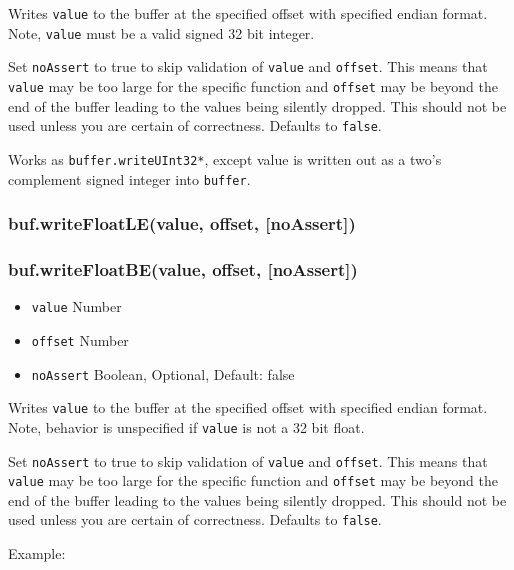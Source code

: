 Writes \texttt{value} to the buffer at the specified offset with
specified endian format. Note, \texttt{value} must be a valid signed 32
bit integer.

Set \texttt{noAssert} to true to skip validation of \texttt{value} and
\texttt{offset}. This means that \texttt{value} may be too large for the
specific function and \texttt{offset} may be beyond the end of the
buffer leading to the values being silently dropped. This should not be
used unless you are certain of correctness. Defaults to \texttt{false}.

Works as \texttt{buffer.writeUInt32*}, except value is written out as a
two's complement signed integer into \texttt{buffer}.

\subsubsection{buf.writeFloatLE(value, offset, {[}noAssert{]})}

\subsubsection{buf.writeFloatBE(value, offset, {[}noAssert{]})}

\begin{itemize}
\item
  \texttt{value} Number
\item
  \texttt{offset} Number
\item
  \texttt{noAssert} Boolean, Optional, Default: false
\end{itemize}

Writes \texttt{value} to the buffer at the specified offset with
specified endian format. Note, behavior is unspecified if \texttt{value}
is not a 32 bit float.

Set \texttt{noAssert} to true to skip validation of \texttt{value} and
\texttt{offset}. This means that \texttt{value} may be too large for the
specific function and \texttt{offset} may be beyond the end of the
buffer leading to the values being silently dropped. This should not be
used unless you are certain of correctness. Defaults to \texttt{false}.

Example:

\begin{Shaded}
\begin{Highlighting}[]
  \NormalTok{);}
\NormalTok{(}\NormalTok{, }\NormalTok{);}


\NormalTok{(}\NormalTok{, }\NormalTok{);}


\end{Highlighting}
\end{Shaded}

